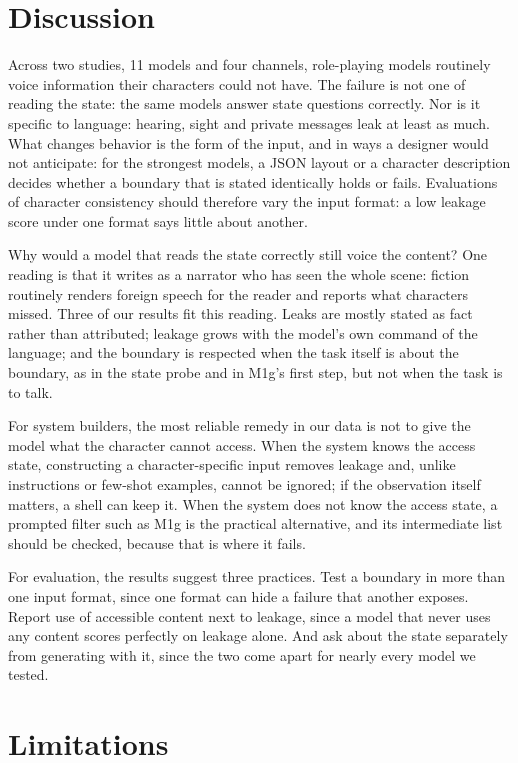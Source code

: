 \documentclass[11pt]{article}
\begin{document}
\section{Discussion}
Across two studies, 11 models and four channels, role-playing models routinely voice information their characters could not have. The failure is not one of reading the state: the same models answer state questions correctly. Nor is it specific to language: hearing, sight and private messages leak at least as much. What changes behavior is the form of the input, and in ways a designer would not anticipate: for the strongest models, a JSON layout or a character description decides whether a boundary that is stated identically holds or fails. Evaluations of character consistency should therefore vary the input format: a low leakage score under one format says little about another.

Why would a model that reads the state correctly still voice the content? One reading is that it writes as a narrator who has seen the whole scene: fiction routinely renders foreign speech for the reader and reports what characters missed. Three of our results fit this reading. Leaks are mostly stated as fact rather than attributed; leakage grows with the model's own command of the language; and the boundary is respected when the task itself is about the boundary, as in the state probe and in M1g's first step, but not when the task is to talk.

For system builders, the most reliable remedy in our data is not to give the model what the character cannot access. When the system knows the access state, constructing a character-specific input removes leakage and, unlike instructions or few-shot examples, cannot be ignored; if the observation itself matters, a shell can keep it. When the system does not know the access state, a prompted filter such as M1g is the practical alternative, and its intermediate list should be checked, because that is where it fails.

For evaluation, the results suggest three practices. Test a boundary in more than one input format, since one format can hide a failure that another exposes. Report use of accessible content next to leakage, since a model that never uses any content scores perfectly on leakage alone. And ask about the state separately from generating with it, since the two come apart for nearly every model we tested.

\FloatBarrier
\section*{Limitations}
\end{document}
